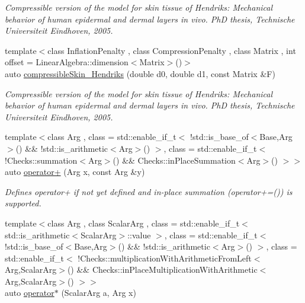 \begin{DoxyCompactItemize}
\begin{DoxyCompactList}\small\item\em Compressible version of the model for skin tissue of Hendriks\-: Mechanical behavior of human epidermal and dermal layers in vivo. Ph\-D thesis, Technische Universiteit Eindhoven, 2005. \end{DoxyCompactList}\item 
{\footnotesize template$<$class Inflation\-Penalty , class Compression\-Penalty , class Matrix , int offset = Linear\-Algebra\-::dimension$<$\-Matrix$>$()$>$ }\\auto \hyperlink{group__Biomechanics_ga3118f1e205132778f07607cf852d40d9}{compressible\-Skin\-\_\-\-Hendriks} (double d0, double d1, const Matrix \&F)
\begin{DoxyCompactList}\small\item\em Compressible version of the model for skin tissue of Hendriks\-: Mechanical behavior of human epidermal and dermal layers in vivo. Ph\-D thesis, Technische Universiteit Eindhoven, 2005. \end{DoxyCompactList}\item 
\hypertarget{namespaceRFFGen_a8dd7fec7e527b37833fc9fab6692da80}{{\footnotesize template$<$class Arg , class  = std\-::enable\-\_\-if\-\_\-t$<$ !std\-::is\-\_\-base\-\_\-of$<$\-Base,\-Arg$>$() \&\& !std\-::is\-\_\-arithmetic$<$\-Arg$>$() $>$, class  = std\-::enable\-\_\-if\-\_\-t$<$ !\-Checks\-::summation$<$\-Arg$>$() \&\&                                       Checks\-::in\-Place\-Summation$<$\-Arg$>$() $>$$>$ }\\auto \hyperlink{namespaceRFFGen_a8dd7fec7e527b37833fc9fab6692da80}{operator+} (Arg x, const Arg \&y)}\label{namespaceRFFGen_a8dd7fec7e527b37833fc9fab6692da80}

\begin{DoxyCompactList}\small\item\em Defines operator+ if not yet defined and in-\/place summation (operator+=()) is supported. \end{DoxyCompactList}\item 
\hypertarget{namespaceRFFGen_af8fbbf79f13356b1bbc8f70ec72df15c}{{\footnotesize template$<$class Arg , class Scalar\-Arg , class  = std\-::enable\-\_\-if\-\_\-t$<$ std\-::is\-\_\-arithmetic$<$\-Scalar\-Arg$>$\-::value $>$, class  = std\-::enable\-\_\-if\-\_\-t$<$ !std\-::is\-\_\-base\-\_\-of$<$\-Base,\-Arg$>$() \&\& !std\-::is\-\_\-arithmetic$<$\-Arg$>$() $>$, class  = std\-::enable\-\_\-if\-\_\-t$<$ !\-Checks\-::multiplication\-With\-Arithmetic\-From\-Left$<$\-Arg,\-Scalar\-Arg$>$() \&\&                                       Checks\-::in\-Place\-Multiplication\-With\-Arithmetic$<$\-Arg,\-Scalar\-Arg$>$() $>$$>$ }\\auto \hyperlink{namespaceRFFGen_af8fbbf79f13356b1bbc8f70ec72df15c}{operator$\ast$} (Scalar\-Arg a, Arg x)}\label{namespaceRFFGen_af8fbbf79f13356b1bbc8f70ec72df15c}


\end{DoxyCompactItemize}
